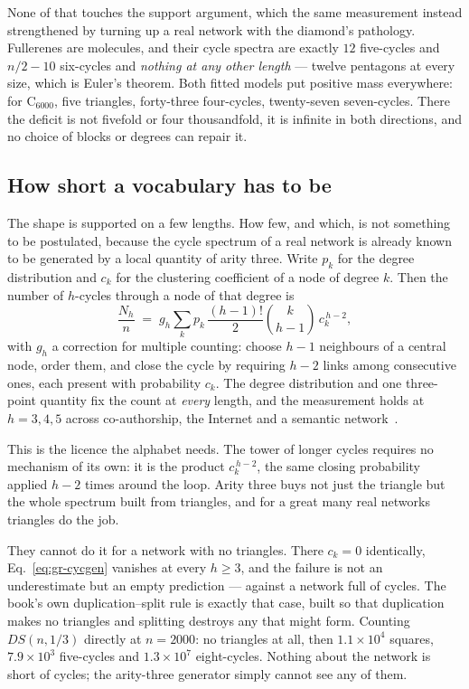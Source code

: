 None of that touches the support argument, which the same measurement instead
strengthened by turning up a real network with the diamond's pathology.
Fullerenes are molecules, and their cycle spectra are exactly $12$ five-cycles
and $n/2-10$ six-cycles and \emph{nothing at any other length} --- twelve
pentagons at every size, which is Euler's theorem. Both fitted models put
positive mass everywhere: for $\mathrm{C}_{6000}$, five triangles, forty-three
four-cycles, twenty-seven seven-cycles. There the deficit is not fivefold or four
thousandfold, it is infinite in both directions, and no choice of blocks or
degrees can repair it.

\subsection*{How short a vocabulary has to be}

The shape is supported on a few lengths. How few, and which, is not something to
be postulated, because the cycle spectrum of a real network is already known to
be generated by a local quantity of arity three. Write $p_k$ for the degree
distribution and $c_k$ for the clustering coefficient of a node of degree $k$.
Then the number of $h$-cycles through a node of that degree
is~\citep{vazquez2005cycles}
\begin{equation}
  \frac{N_h}{n} \;=\; g_h\sum_{k}p_k\,\frac{(h-1)!}{2}\binom{k}{h-1}\,c_k^{\,h-2},
  \label{eq:gr-cycgen}
\end{equation}
with $g_h$ a correction for multiple counting: choose $h-1$ neighbours of a
central node, order them, and close the cycle by requiring $h-2$ links among
consecutive ones, each present with probability $c_k$. The degree distribution
and one three-point quantity fix the count at \emph{every} length, and the
measurement holds at $h=3,4,5$ across co-authorship, the Internet and a semantic
network~\citep{vazquez2005cycles}.

This is the licence the alphabet needs. The tower of longer cycles requires no
mechanism of its own: it is the product $c_k^{\,h-2}$, the same closing
probability applied $h-2$ times around the loop. Arity three buys not just the
triangle but the whole spectrum built from triangles, and for a great many real
networks triangles do the job.

They cannot do it for a network with no triangles. There $c_k=0$ identically,
Eq.~\eqref{eq:gr-cycgen} vanishes at every $h\ge3$, and the failure is not an
underestimate but an empty prediction --- against a network full of cycles. The
book's own duplication--split rule is exactly that case, built so that
duplication makes no triangles and splitting destroys any that might form.
Counting $DS(n,1/3)$ directly at $n=2000$: no triangles at all, then
$1.1\times10^4$ squares, $7.9\times10^3$ five-cycles and $1.3\times10^7$
eight-cycles. Nothing about the network is short of cycles; the arity-three
generator simply cannot see any of them.

